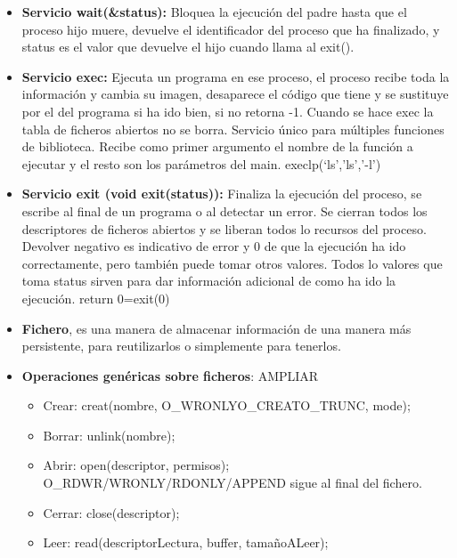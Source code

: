 \documentclass[12pt, twoside, openright]{report} %
\begin{document}
\begin{itemize}
\item \textbf{Servicio wait(\&status):} Bloquea la ejecución del padre hasta
  que el proceso hijo muere, devuelve el identificador del proceso que
  ha finalizado, y status es el valor que devuelve el hijo cuando llama
  al exit().
  
\item \textbf{Servicio exec:} Ejecuta un programa en ese proceso, el proceso
  recibe toda la información y cambia su imagen, desaparece el código
  que tiene y se sustituye por el del programa si ha ido bien, si no
  retorna -1. Cuando se hace exec la tabla de ficheros abiertos no se
  borra. Servicio único para múltiples funciones de biblioteca. Recibe
  como primer argumento el nombre de la función a ejecutar y el resto
  son los parámetros del main. execlp(`ls','ls','-l')
  \pagebreak
\item \textbf{Servicio exit (void exit(status)):} Finaliza la ejecución del
  proceso, se escribe al final de un programa o al detectar un error. Se
  cierran todos los descriptores de ficheros abiertos y se liberan todos
  lo recursos del proceso. Devolver negativo es indicativo de error y 0
  de que la ejecución ha ido correctamente, pero también puede tomar
  otros valores. Todos lo valores que toma status sirven para dar
  información adicional de como ha ido la ejecución. return 0=exit(0)
  
\item \textbf{Fichero}, es una manera de almacenar información de una manera
  más persistente, para reutilizarlos o simplemente para tenerlos.
  
\item \textbf{Operaciones genéricas sobre ficheros}: AMPLIAR
  

  \begin{itemize}
  \item Crear: creat(nombre, O\_WRONLY\textbar O\_CREAT\textbar O\_TRUNC,
    mode);
    
  \item Borrar: unlink(nombre);
    
  \item Abrir: open(descriptor, permisos); O\_RDWR/WRONLY/RDONLY/APPEND
    sigue al final del fichero.
    
  \item Cerrar: close(descriptor);
    
  \item Leer: read(descriptorLectura, buffer, tamañoALeer);
    

\end{itemize}
\end{itemize}
\end{document}
